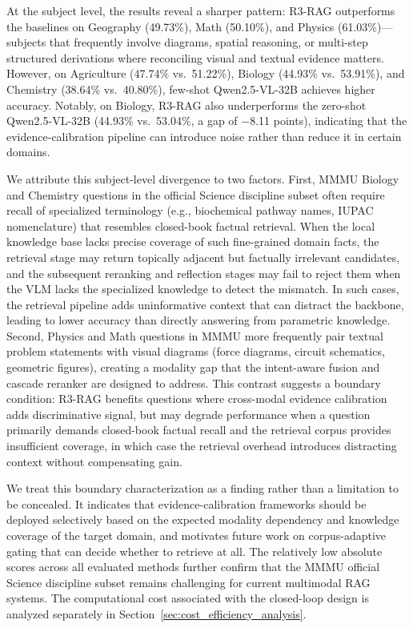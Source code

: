 \documentclass[a4paper, fleqn]{cas-dc}
\begin{document}
At the subject level, the results reveal a sharper pattern: R3-RAG outperforms the baselines on Geography (49.73\%), Math (50.10\%), and Physics (61.03\%)---subjects that frequently involve diagrams, spatial reasoning, or multi-step structured derivations where reconciling visual and textual evidence matters. However, on Agriculture (47.74\% vs.\ 51.22\%), Biology (44.93\% vs.\ 53.91\%), and Chemistry (38.64\% vs.\ 40.80\%), few-shot Qwen2.5-VL-32B achieves higher accuracy. Notably, on Biology, R3-RAG also underperforms the zero-shot Qwen2.5-VL-32B (44.93\% vs.\ 53.04\%, a gap of $-$8.11 points), indicating that the evidence-calibration pipeline can introduce noise rather than reduce it in certain domains.

We attribute this subject-level divergence to two factors. First, MMMU Biology and Chemistry questions in the official Science discipline subset often require recall of specialized terminology (e.g., biochemical pathway names, IUPAC nomenclature) that resembles closed-book factual retrieval. When the local knowledge base lacks precise coverage of such fine-grained domain facts, the retrieval stage may return topically adjacent but factually irrelevant candidates, and the subsequent reranking and reflection stages may fail to reject them when the VLM lacks the specialized knowledge to detect the mismatch. In such cases, the retrieval pipeline adds uninformative context that can distract the backbone, leading to lower accuracy than directly answering from parametric knowledge. Second, Physics and Math questions in MMMU more frequently pair textual problem statements with visual diagrams (force diagrams, circuit schematics, geometric figures), creating a modality gap that the intent-aware fusion and cascade reranker are designed to address. This contrast suggests a boundary condition: R3-RAG benefits questions where cross-modal evidence calibration adds discriminative signal, but may degrade performance when a question primarily demands closed-book factual recall and the retrieval corpus provides insufficient coverage, in which case the retrieval overhead introduces distracting context without compensating gain.

We treat this boundary characterization as a finding rather than a limitation to be concealed. It indicates that evidence-calibration frameworks should be deployed selectively based on the expected modality dependency and knowledge coverage of the target domain, and motivates future work on corpus-adaptive gating that can decide whether to retrieve at all. The relatively low absolute scores across all evaluated methods further confirm that the MMMU official Science discipline subset remains challenging for current multimodal RAG systems. The computational cost associated with the closed-loop design is analyzed separately in Section~\ref{sec:cost_efficiency_analysis}.
\end{document}
